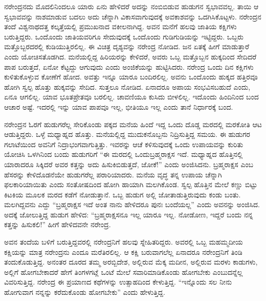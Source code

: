 ನರೇಂದ್ರನದು ಮೊದಲಿನಿಂದಲೂ ಯಾರು ಏನು ಹೇಳಿದರೆ ಅದನ್ನು ನಂಬಿಬಿಡುವ ಹುಡುಗನ ಸ್ವಭಾವವಲ್ಲ. ತಾಯಿ ಆ ಸ್ವಭಾವವನ್ನು ನಾಶಮಾಡುವ ಬದಲು ಅದು ಚೆನ್ನಾಗಿ ವಿಕಾಸವಾಗುವುದಕ್ಕೆ ಅವಕಾಶವನ್ನು ಒದಗಿಸಿಕೊಟ್ಟಳು. ನರೇಂದ್ರನ ತಂದೆ ವಿಶ್ವನಾಥದತ್ತ ಕಲ್ಕತ್ತೆಯಲ್ಲಿ ಪ್ರಮುಖನಾದ ವಕೀಲನಾಗಿದ್ದ. ಅವನ ಮನೆಗೆ ಹಲವು ಜಾತಿಯ ಕಕ್ಷಿಗಳು ಬರುತ್ತಿದ್ದರು. ಒಂದೊಂದು ಜಾತಿಯವರಿಗೂ ಸೇದುವುದಕ್ಕೆ ಒಂದೊಂದು ಗುಡಿಗುಡಿಯನ್ನು ಇಟ್ಟಿದ್ದರು. ಒಬ್ಬರು ಮತ್ತೊಬ್ಬರದರಲ್ಲಿ ಕುಡಿಯುತ್ತಿರಲಿಲ್ಲ. ಈ ವಿಚಿತ್ರ ದೃಶ್ಯವನ್ನು ನರೇಂದ್ರ ನೋಡಿದ. ಜನ ಏತಕ್ಕೆ ಹೀಗೆ ಮಾಡುತ್ತಾರೆ ಎಂದು ಯೋಚಿಸತೊಡಗಿದ. ಮನೆಯಲ್ಲಿದ್ದ ಹಿರಿಯರನ್ನು ಕೇಳಿದರೆ, ಅವರು ಒಬ್ಬ ಮತ್ತೊಬ್ಬನ ಹುಕ್ಕದಿಂದ ಸೇದಿದರೆ ಪಾಪ ಬರುತ್ತದೆ, ಏನೋ ಕೆಟ್ಟದ್ದು ಆಗುವುದು ಎಂದು ಅಂಜಿಕೆಯನ್ನು ಹುಟ್ಟಿಸಿದರು. ನರೇಂದ್ರ ಒಂದು ದಿನ ಕಕ್ಷಿಗಳು ಕುಳಿತುಕೊಳ್ಳುವ ಕೋಣೆಗೆ ಹೋದ. ಅವತ್ತು ಇನ್ನೂ ಯಾರೂ ಬಂದಿರಲಿಲ್ಲ. ಅವನು ಒಂದೊಂದು ಹುಕ್ಕದ ಹತ್ತಿರವೂ ಹೋಗಿ ಸ್ವಲ್ಪ ಹೊತ್ತು ಹುಕ್ಕವನ್ನು ಸೇದಿದ. ಸುತ್ತಲೂ ನೋಡಿದ. ಏನಾದರೂ ಅಪಾಯ ಸಂಭವಿಸಬಹುದೆ ಎಂದು, ಏನೂ ಆಗಲಿಲ್ಲ. ಯಾವ ಭೂತಪ್ರೇತವೂ ಬರಲಿಲ್ಲ. ಚಾವಣಿಯೂ ಕುಸಿದು ಬೀಳಲಿಲ್ಲ. ಇದೊಂದು ಹಿಂದಿನಿಂದ ಬಂದ ಆಚಾರ ಅಷ್ಟೆ. ಇದರಲ್ಲಿ ಇನ್ನು ಯಾವ ಪಾಪವೂ ಇಲ್ಲ, ಭೀತಿಯೂ ಇಲ್ಲ ಎಂದು ತಾನೆ ನಿರ್ಧಾರಕ್ಕೆ ಬಂದ.

ನರೇಂದ್ರನ ಓರಗೆ ಹುಡುಗರೆಲ್ಲ ಸೇರಿಕೊಂಡು ಪಕ್ಕದ ಮನೆಯ ಹಿಂದೆ ಇದ್ದ ಒಂದು ದೊಡ್ಡ ಮರದಲ್ಲಿ ಮರಕೋತಿ ಆಟ ಆಡುತ್ತಿದ್ದರು. ಒಳ್ಳೆ ಮಧ್ಯಾಹ್ನದ ಹೊತ್ತು. ಮನೆಯಲ್ಲಿದ್ದ ಮುದುಕನೊಬ್ಬನು ನಿದ್ರಿಸುತ್ತಿದ್ದ ಸಮಯ. ಈ ಹುಡುಗರ ಗಲಾಟೆಯಿಂದ ಅವನಿಗೆ ನಿದ್ರಾಭಂಗವಾಗುತ್ತಿತ್ತು. ಇವರನ್ನು ಆಚೆ ಕಳಿಸುವುದಕ್ಕೆ ಒಂದು ಉಪಾಯವನ್ನು ಕುರಿತು ಯೋಚಿಸಿ ಒಳಗಿನಿಂದ ಬಂದು ಹುಡುಗರಿಗೆ “ಈ ಮರದಲ್ಲಿ ಒಂದು\break ಬ್ರಹ್ಮರಾಕ್ಷಸ ಇದೆ. ಮಧ್ಯಾಹ್ನದ ಹೊತ್ತಿನಲ್ಲಿ ಯಾರಾದರೂ ಸಿಕ್ಕಿದರೆ ಅವರ ಕತ್ತನ್ನು ಅದು ಹಿಸುಕಿಬಿಡುತ್ತದೆ, ಜೋಕೆ!” ಎಂದು ಅಂಜಿಸಿದನು. ಬ್ರಹ್ಮರಾಕ್ಷಸ ಎಂಬ ಹೆಸರನ್ನು ಕೇಳಿದೊಡನೆಯೇ ಹುಡುಗರೆಲ್ಲ ಪರಾರಿಯಾದರು. ಮನೆಯ ವೃದ್ಧ ತನ್ನ ಉಪಾಯ ಚೆನ್ನಾಗಿ ಫಲಕಾರಿಯಾಯಿತು ಎಂದು ಸಂತೋಷದಿಂದ ಹೋಗಿ ಹಾಯಾಗಿ ಮಲಗಿಕೊಂಡ. ಸ್ವಲ್ಪ ಹೊತ್ತಿನ ಮೇಲೆ ಕಣ್ಣು ಬಿಟ್ಟು ಕಿಟಕಿಯ ಮೂಲಕ ಮರದ ಕಡೆಗೆ ನೋಡುತ್ತಾನೆ. ಒಬ್ಬ ಹುಡುಗ ಅಲ್ಲಿ ಜೋತಾಡುತ್ತಿರುವುದು ಕಂಡು ಬಂತು. ಮಲಗಿದ್ದವನು ಎದ್ದು “ಬ್ರಹ್ಮರಾಕ್ಷಸ ಇದೆ ಅಂತ ನಾನು ಹೇಳಿದರೂ ಪುನಃ ಬಂದೆಯಲ್ಲ” ಎಂದು ಅವನನ್ನು ಅಂಜಿಸಿದ. ಅದಕ್ಕೆ ಜೋಲುತ್ತಿದ್ದ ಹುಡುಗ ಹೇಳಿದ: “ಬ್ರಹ್ಮರಾಕ್ಷಸನೂ ಇಲ್ಲ ಯಾರೂ ಇಲ್ಲ. ನೋಡೋಣ, ಇದ್ದರೆ ಬಂದು ನನ್ನ ಕತ್ತನ್ನು ಹಿಸುಕಲಿ!” ಹೀಗೆ ಹೇಳಿದವನೇ ನರೇಂದ್ರ.

ಅವನ ತಂದೆಯ ಬಳಿಗೆ ಬರುತ್ತಿದ್ದವರಲ್ಲಿ ನರೇಂದ್ರನಿಗೆ ಹಲವು ಸ್ನೇಹಿತರಿದ್ದರು. ಅವರಲ್ಲಿ ಒಬ್ಬ ಮಹಮ್ಮದೀಯ ಕಕ್ಷಿಯನ್ನು ಮಾತ್ರ ನರೇಂದ್ರನು ಎಂದೂ ಮರೆತಿರಲಿಲ್ಲ. ಆ ಕಕ್ಷಿ ಬರುವಾಗಲೆಲ್ಲ ಏನಾದರೂ ನರೇಂದ್ರನಿಗೆ ತಿಂಡಿ ತಂದುಕೊಡುತ್ತಿದ್ದ. ಅನಂತರ ದೂರದ ತಮ್ಮ ಅರಬ್ಬಿದೇಶ, ಅಲ್ಲಿರುವ ಮೆಕ್ಕ ಮದೀನ, ಅಲ್ಲಿರುವ ಮರಳು ಕಾಡುಗಳು, ಅಲ್ಲಿಗೆ ಹೋಗಬೇಕಾದರೆ ಹೇಗೆ ತಿಂಗಳಗಟ್ಲೆ ಒಂಟೆ ಮೇಲೆ ಸವಾರಿಮಾಡಿಕೊಂಡು ಹೋಗಬೇಕು ಎಂಬುದನ್ನೆಲ್ಲ ವಿವರಿಸುತ್ತಿದ್ದ. ನರೇಂದ್ರ ಈ ಪ್ರಯಾಣದ ಕಥೆಗಳನ್ನು ಉತ್ಸಾಹದಿಂದ ಕೇಳುತ್ತಿದ್ದ. “ಇನ್ನೊಂದು ಸಲ ನೀನು ಹೋಗುವಾಗ ನನ್ನನ್ನು ಕರೆದುಕೊಂಡು ಹೋಗಬೇಕು” ಎಂದು ಹೇಳುತ್ತಿದ್ದ.

